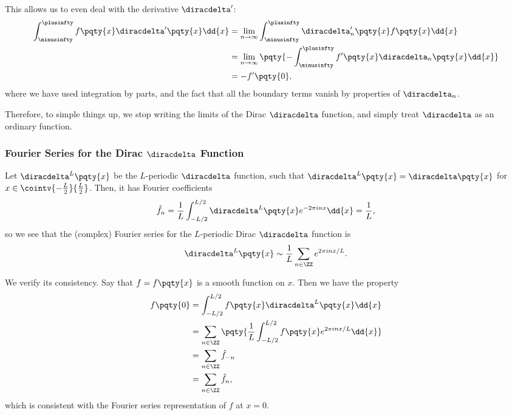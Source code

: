 This allows us to even deal with the derivative \(\diracdelta'\):
\begin{subequations}
    \begin{align}
        \int_{\minusinfty}^{\plusinfty} f\pqty{x} \diracdelta' \pqty{x} \dd{x} &= \lim_{n \to \infty} \int_{\minusinfty}^{\plusinfty} \diracdelta_n' \pqty{x} f\pqty{x} \dd{x} \\
        &= \lim_{n \to \infty} \pqty{- \int_{\minusinfty}^{\plusinfty} f'\pqty{x} \diracdelta_n \pqty{x} \dd{x}} \\
        &= - f'\pqty{0},
    \end{align}
\end{subequations}
where we have used integration by parts, and the fact that all the boundary terms vanish by properties of \(\diracdelta_n\).

Therefore, to simple things up, we stop writing the limits of the Dirac \(\diracdelta\) function, and simply treat \(\diracdelta\) as an ordinary function.

\subsubsection{Fourier Series for the Dirac \(\diracdelta\) Function}

Let \(\diracdelta^L\pqty{x}\) be the \(L\)-periodic \(\diracdelta\) function, such that \(\diracdelta^L\pqty{x} = \diracdelta\pqty{x}\) for \(x \in \cointv{-\frac{L}{2}}{\frac{L}{2}}\). Then, it has Fourier coefficients
\begin{equation}
    \hat{f}_n = \frac{1}{L} \int_{-L/2}^{L/2} \diracdelta^L\pqty{x} e^{- 2 \pi i n x} \dd{x} = \frac{1}{L},
\end{equation}
so we see that the (complex) Fourier series for the \(L\)-periodic Dirac \(\diracdelta\) function is
\begin{equation}
    \diracdelta^L\pqty{x} \sim \frac{1}{L} \sum_{n \in \ZZ} e^{2 \pi i n x / L}.
\end{equation}

We verify its consistency. Say that \(f = f\pqty{x}\) is a smooth function on \(x\). Then we have the property
\begin{subequations}
    \begin{align}
        f\pqty{0} &= \int_{-L/2}^{L/2} f\pqty{x} \diracdelta^L\pqty{x} \dd{x} \\
        &= \sum_{n \in \ZZ} \pqty{\frac{1}{L} \int_{-L/2}^{L/2} f\pqty{x} e^{2 \pi i n x / L} \dd{x}} \\
        &= \sum_{n \in \ZZ} \hat{f}_{-n} \\
        &= \sum_{n \in \ZZ} \hat{f}_n,
    \end{align}
\end{subequations}
which is consistent with the Fourier series representation of \(f\) at \(x = 0\).

